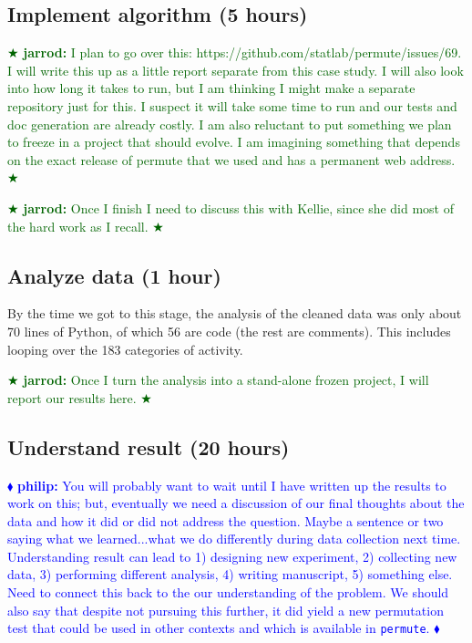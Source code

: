 \documentclass[]{article}
\newcommand{\philip}[1] { \textcolor{blue} {
\ensuremath{\blacklozenge} {\bf philip:}  {#1}
\ensuremath{\blacklozenge} } }
\newcommand{\jarrod}[1] { \textcolor{darkgreen} {
\ensuremath{\bigstar} {\bf jarrod:}  {#1}
\ensuremath{\bigstar} } }
\begin{document}
\subsection{Implement algorithm (5 hours)}

\jarrod{I plan to go over this:  https://github.com/statlab/permute/issues/69.
I will write this up as a little report separate from this case study.  I will
also look into how long it takes to run, but I am thinking I might make a
separate repository just for this.  I suspect it will take some time to run and
our tests and doc generation are already costly.  I am also reluctant to put
something we plan to freeze in a project that should evolve.  I am imagining
something that depends on the exact release of permute that we used and has a
permanent web address.}

\jarrod{Once I finish I need to discuss this with Kellie, since she did most of
the hard work as I recall.}
  

\subsection{Analyze data (1 hour)}

By the time we got to this stage, the analysis of the cleaned data was only
about 70 lines of Python, of which 56 are code (the rest are comments).
This includes looping over the 183 categories of activity.

\jarrod{Once I turn the analysis into a stand-alone frozen project, I
will report our results here.}

\subsection{Understand result (20 hours)}

\philip{You will probably want to wait until I have written up the results to
work on this; but, eventually we need a discussion of our final thoughts about
the data and how it did or did not address the question.  Maybe a sentence or
two saying what we learned...what we do differently during data collection next
time.  Understanding result can lead to 1) designing new experiment, 2)
collecting new data, 3) performing different analysis, 4) writing manuscript,
5) something else.  Need to connect this back to the our understanding of the
problem.  We should also say that despite not pursuing this further, it did
yield a new permutation test that could be used in other contexts and which is
available in \texttt{permute}.  }
\end{document}
